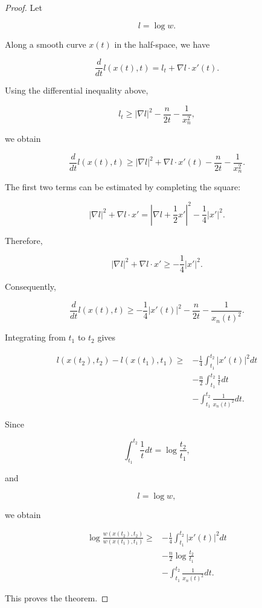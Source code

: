 \documentclass[11pt]{amsart}
\theoremstyle{definition}
\theoremstyle{remark}
\begin{document}

\begin{proof}

Let

\[
l=\log w .
\]

Along a smooth curve $x(t)$ in the half-space, we have

\[
\frac{d}{dt}l(x(t),t)
=
l_t+\nabla l\cdot x'(t).
\]

Using the differential inequality above,

\[
l_t
\geq
|\nabla l|^2
-\frac n{2t}
-\frac1{x_n^2},
\]

we obtain

\[
\frac{d}{dt}l(x(t),t)
\geq
|\nabla l|^2
+
\nabla l\cdot x'(t)
-
\frac n{2t}
-\frac1{x_n^2}.
\]

The first two terms can be estimated by completing the square:

\[
|\nabla l|^2
+
\nabla l\cdot x'
=
\left|
\nabla l+\frac12x'
\right|^2
-
\frac14|x'|^2 .
\]

Therefore,

\[
|\nabla l|^2
+
\nabla l\cdot x'
\geq
-\frac14|x'|^2 .
\]

Consequently,

\[
\frac{d}{dt}l(x(t),t)
\geq
-\frac14|x'(t)|^2
-\frac n{2t}
-\frac1{x_n(t)^2}.
\]

Integrating from $t_1$ to $t_2$ gives

\[
\begin{aligned}
l(x(t_2),t_2)-l(x(t_1),t_1)
\geq&
-\frac14
\int_{t_1}^{t_2}
|x'(t)|^2dt
\\
&
-\frac n2
\int_{t_1}^{t_2}
\frac1t dt
\\
&
-
\int_{t_1}^{t_2}
\frac1{x_n(t)^2}dt .
\end{aligned}
\]

Since

\[
\int_{t_1}^{t_2}\frac1t dt
=
\log\frac{t_2}{t_1},
\]

and

\[
l=\log w,
\]

we obtain

\[
\begin{aligned}
\log
\frac{w(x(t_2),t_2)}
     {w(x(t_1),t_1)}
\geq&
-\frac14
\int_{t_1}^{t_2}
|x'(t)|^2dt
\\
&
-\frac n2
\log\frac{t_2}{t_1}
\\
&
-
\int_{t_1}^{t_2}
\frac1{x_n(t)^2}dt .
\end{aligned}
\]

This proves the theorem.

\end{proof}
\end{document}
